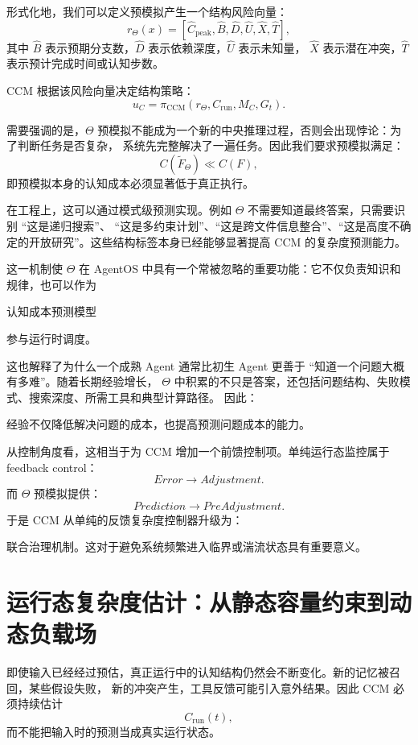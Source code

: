形式化地，我们可以定义预模拟产生一个结构风险向量：
\[
r_{\Theta}(x)
=
[
\widehat C_{\mathrm{peak}},
\widehat B,
\widehat D,
\widehat U,
\widehat X,
\widehat T
],
\]
其中 $\widehat B$ 表示预期分支数，$\widehat D$ 表示依赖深度，$\widehat U$ 表示未知量，
$\widehat X$ 表示潜在冲突，$\widehat T$ 表示预计完成时间或认知步数。

CCM 根据该风险向量决定结构策略：
\[
u_C
=
\pi_{\mathrm{CCM}}
\left(
r_{\Theta},
C_{\mathrm{run}},
M_C,
G_t
\right).
\]

需要强调的是，$\Theta$ 预模拟不能成为一个新的中央推理过程，否则会出现悖论：为了判断任务是否复杂，
系统先完整解决了一遍任务。因此我们要求预模拟满足：
\[
C(\widetilde F_{\Theta})
\ll
C(F),
\]
即预模拟本身的认知成本必须显著低于真正执行。

在工程上，这可以通过模式级预测实现。例如 $\Theta$ 不需要知道最终答案，只需要识别 ``这是递归搜索''、
``这是多约束计划''、``这是跨文件信息整合''、``这是高度不确定的开放研究''。这些结构标签本身已经能够显著提高
CCM 的复杂度预测能力。

这一机制使 $\Theta$ 在 AgentOS 中具有一个常被忽略的重要功能：它不仅负责知识和规律，也可以作为
\begin{proposition*}
认知成本预测模型
\end{proposition*}
参与运行时调度。

这也解释了为什么一个成熟 Agent 通常比初生 Agent 更善于 ``知道一个问题大概有多难''。随着长期经验增长，
$\Theta$ 中积累的不只是答案，还包括问题结构、失败模式、搜索深度、所需工具和典型计算路径。
因此：
\begin{statementbox}
经验不仅降低解决问题的成本，也提高预测问题成本的能力。
\end{statementbox}

从控制角度看，这相当于为 CCM 增加一个前馈控制项。单纯运行态监控属于 feedback control：
\[
Error
\to
Adjustment.
\]
而 $\Theta$ 预模拟提供：
\[
Prediction
\to
PreAdjustment.
\]
于是 CCM 从单纯的反馈复杂度控制器升级为：
\begin{statementbox}
\centering
{}
\end{statementbox}
联合治理机制。这对于避免系统频繁进入临界或湍流状态具有重要意义。


\section{运行态复杂度估计：从静态容量约束到动态负载场}

即使输入已经经过预估，真正运行中的认知结构仍然会不断变化。新的记忆被召回，某些假设失败，
新的冲突产生，工具反馈可能引入意外结果。因此 CCM 必须持续估计
\[
C_{\mathrm{run}}(t),
\]
而不能把输入时的预测当成真实运行状态。

